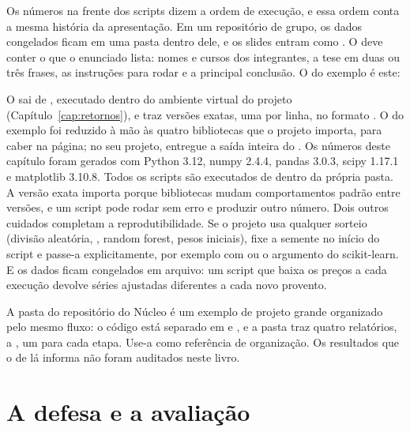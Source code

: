 Os números na frente dos scripts dizem a ordem de execução, e essa ordem conta a mesma história da apresentação. Em um repositório de grupo, os dados congelados ficam em uma pasta  dentro dele, e os slides entram como . O  deve conter o que o enunciado lista: nomes e cursos dos integrantes, a tese em duas ou três frases, as instruções para rodar e a principal conclusão. O do exemplo é este:



O  sai de , executado dentro do ambiente virtual do projeto (Capítulo~\ref{cap:retornos}), e traz versões exatas, uma por linha, no formato . O do exemplo foi reduzido à mão às quatro bibliotecas que o projeto importa, para caber na página; no seu projeto, entregue a saída inteira do . Os números deste capítulo foram gerados com Python 3.12, numpy 2.4.4, pandas 3.0.3, scipy 1.17.1 e matplotlib 3.10.8. Todos os scripts são executados de dentro da própria pasta. A versão exata importa porque bibliotecas mudam comportamentos padrão entre versões, e um script pode rodar sem erro e produzir outro número. Dois outros cuidados completam a reprodutibilidade. Se o projeto usa qualquer sorteio (divisão aleatória, , random forest, pesos iniciais), fixe a semente no início do script e passe-a explicitamente, por exemplo com  ou o argumento  do scikit-learn. E os dados ficam congelados em arquivo: um script que baixa os preços a cada execução devolve séries ajustadas diferentes a cada novo provento.

\begin{repositorio}
A pasta  do repositório do Núcleo é um exemplo de projeto grande organizado pelo mesmo fluxo: o código está separado em  e , e a pasta  traz quatro relatórios,  a , um para cada etapa. Use-a como referência de organização. Os resultados que o  de lá informa não foram auditados neste livro.
\end{repositorio}

\section{A defesa e a avaliação}
\label{sec:c15-defesa}

